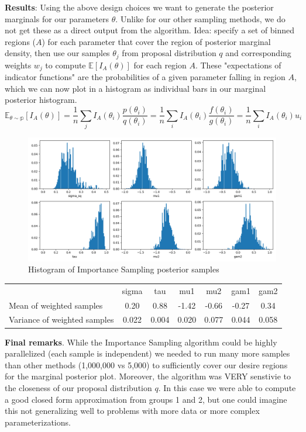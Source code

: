 \documentclass[12pt,letterpaper,twoside]{article}
\begin{document}
\textbf{Results}: Using the above design choices we want to generate 
the posterior marginals for our parameters $\theta$. Unlike for our other 
sampling methods, we do not get these as a direct output from the algorithm.
Idea: specify a set of binned regions ($A$) for each parameter  that cover 
the region of posterior marginal density, then use our samples $\theta_j$ 
from proposal distribution $q$ and corresponding weights $w_j$ to compute 
$\mathbb{E}[I_A(\theta)]$ for each region $A$. These "expectations of indicator 
functions" are the probabilities of a given parameter falling in region $A$, which 
we can now plot in a histogram as individual bars in our marginal posterior histogram.   
$$ \mathbb{E_{\theta \sim p}}[I_A(\theta)] = \frac{1}{n} \sum_j I_A(\theta_i) \frac{p(\theta_i)}{q(\theta_i)} = \frac{1}{n} \sum_i I_A(\theta_i) \frac{f(\theta_i)}{g(\theta_i)} = \frac{1}{n} \sum_i I_A(\theta_i) u_i$$
\begin{figure}[H]
    \centering
    \includegraphics[scale=0.55]{mis_sampled_histogram.png}
    \caption{Histogram of Importance Sampling posterior samples}
\end{figure}

\begin{table}[H]
    \begin{tabular}{lcccccc}
    \multicolumn{1}{c}{}         & sigma & tau   & mu1   & mu2   & gam1  & gam2  \\
    Mean of weighted samples     & 0.20  & 0.88  & -1.42 & -0.66 & -0.27 & 0.34  \\
    Variance of weighted samples & 0.022 & 0.004 & 0.020 & 0.077 & 0.044 & 0.058
    \end{tabular}
\end{table}

\textbf{Final remarks}. While the Importance Sampling algorithm could be highly parallelized 
(each sample is independent) we needed to run many more samples than other methods (1,000,000 
vs 5,000) to sufficiently cover our desire regions for the marginal posterior plot. Moreover, 
the algorithm was VERY senstivie to the closeness of our proposal distribution $q$. In this 
case we were able to compute a good closed form approximation from groups 1 and 2, but one 
could imagine this not generalizing well to problems with more data or more complex 
parameterizations.  
\end{document}
